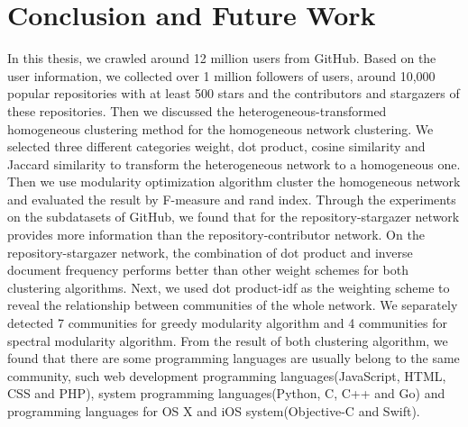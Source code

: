 \documentclass[12pt,oneside,final]{vlsithesis}
\begin{document}
\chapter{Conclusion and Future Work}\label{chapter:conclusion}
In this thesis, we crawled around 12 million users from GitHub. Based on the user information, we collected over 1 million followers of users, around 10,000 popular repositories with at least 500 stars and the contributors and stargazers of these repositories. Then we discussed the heterogeneous-transformed homogeneous clustering method for the homogeneous network clustering. We selected three different categories weight, dot product, cosine similarity and Jaccard similarity to transform the heterogeneous network to a homogeneous one. Then we use modularity optimization algorithm cluster the homogeneous network and evaluated the result by F-measure and rand index. Through the experiments on the subdatasets of GitHub, we found that for the repository-stargazer network provides more information than the repository-contributor network. On the repository-stargazer network, the combination of dot product and inverse document frequency performs better than other weight schemes for both clustering algorithms. Next, we used dot product-idf as the weighting scheme to reveal the relationship between communities of the whole network. We separately detected 7 communities for greedy modularity algorithm and 4 communities for spectral modularity algorithm. From the result of both clustering algorithm, we found that there are some programming languages are usually belong to the same community, such web development programming languages(JavaScript, HTML, CSS and PHP), system programming languages(Python, C, C++ and Go) and programming languages for OS X and iOS system(Objective-C and Swift). 
\end{document}
